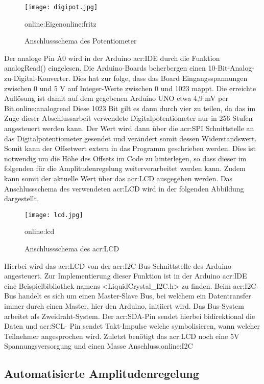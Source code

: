 \begin{figure}[H]
	\centering
	\texttt{[image: digipot.jpg]}
	\caption[Anschlussschema des Potentiometer]{Anschlussschema des Potentiometer} 
	\gls{online:Eigen}\gls{online:fritz}
	\label{fig:digipot}
\end{figure}

Der analoge Pin A0 wird in der Arduino \gls{acr:IDE} durch die Funktion analogRead() eingelesen. Die Arduino-Boards beherbergen einen 10-Bit-Analog-zu-Digital-Konverter. Dies hat zur folge, dass das Board Eingangsspannungen zwischen 0 und 5 V auf Integer-Werte zwischen 0 und 1023 mappt. Die erreichte Auflösung ist damit auf dem gegebenen Arduino UNO etwa 4,9 mV per Bit.\gls{online:analogread} Diese 1023 Bit gilt es dann durch vier zu teilen, da das im Zuge dieser Abschlussarbeit verwendete Digitalpotentiometer nur in 256 Stufen angesteuert werden kann. Der Wert wird dann über die \gls{acr:SPI} Schnittstelle an das Digitalpotentiometer gesendet und verändert somit dessen Widerstandswert. Somit kann der Offsetwert extern in das Programm geschrieben werden. Dies ist notwendig um die Höhe des Offsets im Code zu hinterlegen, so dass dieser im folgenden für die Amplitudenregelung weiterverarbeitet werden kann. Zudem kann somit der aktuelle Wert über das \gls{acr:LCD} ausgegeben werden. Das Anschlussschema des verwendeten \gls{acr:LCD} wird in der folgenden Abbildung dargestellt.

\begin{figure}[H]
	\centering
	\texttt{[image: lcd.jpg]}
	\caption[Anschlussschema des \gls{acr:LCD}]{Anschlussschema des \gls{acr:LCD}} 
	\gls{online:lcd}
	\label{fig:lcd}
\end{figure}

Hierbei wird das \gls{acr:LCD} von der \gls{acr:I2C}-Bus-Schnittstelle des Arduino angesteuert. Zur Implementierung dieser Funktion ist in der Arduino \gls{acr:IDE} eine Beispielbibliothek namens <LiquidCrystal\_I2C.h> zu finden. Beim \gls{acr:I2C}-Bus handelt es sich um einen Master-Slave Bus, bei welchem ein Datentransfer immer durch einen Master, hier den Arduino, initiiert wird. Das Bus-System arbeitet als Zweidraht-System. Der \gls{acr:SDA}-Pin sendet hierbei bidirektional die Daten und \gls{acr:SCL}- Pin sendet Takt-Impulse welche symbolisieren, wann welcher Teilnehmer angesprochen wird. Zuletzt benötigt das \gls{acr:LCD} noch eine 5V Spannungsversorgung und einen Masse Anschluss.\gls{online:I2C}

\subsection{Automatisierte Amplitudenregelung}
\label{subsec:autoamp}

